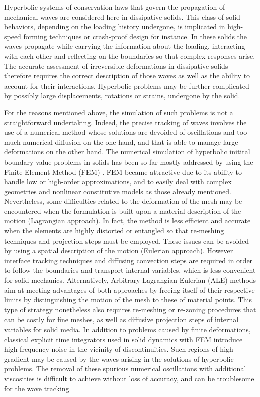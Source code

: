 Hyperbolic systems of conservation laws that govern the propagation of mechanical waves are considered here in dissipative solids.
This class of solid behaviors, depending on the loading history undergone, is implicated in high-speed forming techniques or crash-proof design for instance.
In these solids the waves propagate while carrying the information about the loading, interacting with each other and reflecting on the boundaries so that complex responses arise.
The accurate assessment of irreversible deformations in dissipative solids therefore requires the correct description of those waves as well as the ability to account for their interactions.
Hyperbolic problems may be further complicated by possibly large displacements, rotations or strains, undergone by the solid.

For the reasons mentioned above, the simulation of such problems is not a straightforward undertaking.
Indeed, the precise tracking of waves involves the use of a numerical method whose solutions are devoided of oscillations and too much numerical diffusion on the one hand, and that is able to manage large deformations on the other hand.
The numerical simulation of hyperbolic initital boundary value problems in solids has been so far mostly addressed by using the Finite Element Method (FEM) \cite{Belytschko}.
FEM became attractive due to its ability to handle low or high-order approximations, and to easily deal with complex geometries and nonlinear constitutive models as those already mentioned.
Nevertheless, some difficulties related to the deformation of the mesh may be encountered when the formulation is built upon a material description of the motion (Lagrangian approach). 
In fact, the method is less efficient and accurate when the elements are highly distorted or entangled so that re-meshing techniques and projection steps must be employed.
These issues can be avoided by using a spatial description of the motion (Eulerian approach).
However interface tracking techniques and diffusing convection steps are required in order to follow the boundaries and transport internal variables, which is less convenient for solid mechanics.
Alternatively, Arbitrary Lagrangian Eulerian (ALE) methods aim at meeting advantages of both approaches by freeing itself of their respective limits by distinguishing the motion of the mesh to these of material points.
This type of strategy nonetheless also requires re-meshing or re-zoning procedures that can be costly for fine meshes, as well as diffusive projection steps of internal variables for solid media.
In addition to problems caused by finite deformations, classical explicit time integrators used in solid dynamics with FEM introduce high frequency noise in the vicinity of discontinuities.
Such regions of high gradient may be caused by the waves arising in the solutions of hyperbolic problems.
The removal of these spurious numerical oscillations with additional viscosities is difficult to achieve without loss of accuracy, and can be troublesome for the wave tracking.

